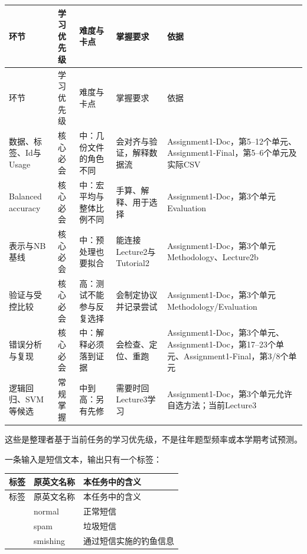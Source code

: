 \begingroup
\small\setlength{\tabcolsep}{3pt}
\renewcommand{\arraystretch}{1.22}
\begin{longtable}{@{}>{\raggedright\arraybackslash}p{}>{\raggedright\arraybackslash}p{}>{\raggedright\arraybackslash}p{}>{\raggedright\arraybackslash}p{}>{\raggedright\arraybackslash}p{}@{}}
\toprule
环节 & 学习优先级 & 难度与卡点 & 掌握要求 & 依据 \\
\midrule\endfirsthead
环节 & 学习优先级 & 难度与卡点 & 掌握要求 & 依据 \\
\midrule\endhead
\bottomrule\endfoot
数据、标签、Id与Usage & 核心必会 & 中：几份文件的角色不同 & 会对齐与验证，解释数据流 & Assignment1-Doc，第5–12个单元、Assignment1-Final，第5–6个单元及实际CSV \\
Balanced accuracy & 核心必会 & 中：宏平均与整体比例不同 & 手算、解释、用于选择 & Assignment1-Doc，第3个单元 Evaluation \\
表示与NB基线 & 核心必会 & 中：预处理也要拟合 & 能连接Lecture2与Tutorial2 & Assignment1-Doc，第3个单元 Methodology、Lecture2b \\
验证与受控比较 & 核心必会 & 高：测试不能参与反复选择 & 会制定协议并记录尝试 & Assignment1-Doc，第3个单元 Methodology/Evaluation \\
错误分析与复现 & 核心必会 & 中：解释必须落到证据 & 会检查、定位、重跑 & Assignment1-Doc，第3个单元、Assignment1-Doc，第17–23个单元、Assignment1-Final，第3/8个单元 \\
逻辑回归、SVM等候选 & 常规掌握 & 中到高：另有先修 & 需要时回Lecture3学习 & Assignment1-Doc，第3个单元允许自选方法；当前Lecture3 \\
\end{longtable}
\endgroup


这些是整理者基于当前任务的学习优先级，不是往年题型频率或本学期考试预测。








一条输入是短信文本，输出只有一个标签：


\begingroup
\small\setlength{\tabcolsep}{3pt}
\renewcommand{\arraystretch}{1.22}
\begin{longtable}{@{}>{\raggedright\arraybackslash}p{}>{\raggedright\arraybackslash}p{}>{\raggedright\arraybackslash}p{}@{}}
\toprule
标签 & 原英文名称 & 本任务中的含义 \\
\midrule\endfirsthead
标签 & 原英文名称 & 本任务中的含义 \\
\midrule\endhead
\bottomrule\endfoot
0 & normal & 正常短信 \\
1 & spam & 垃圾短信 \\
2 & smishing & 通过短信实施的钓鱼信息 \\
\end{longtable}
\endgroup


